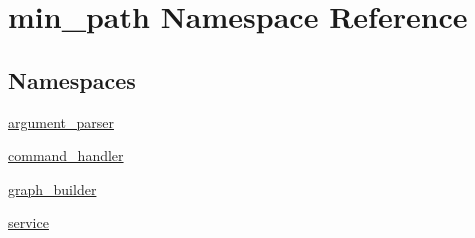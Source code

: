 \hypertarget{a00033}{}\section{min\+\_\+path Namespace Reference}
\label{a00033}
\subsection*{Namespaces}
\begin{DoxyCompactItemize}
\item 
 \hyperlink{a00034}{argument\+\_\+parser}
\item 
 \hyperlink{a00035}{command\+\_\+handler}
\item 
 \hyperlink{a00036}{graph\+\_\+builder}
\item 
 \hyperlink{a00037}{service}
\end{DoxyCompactItemize}
